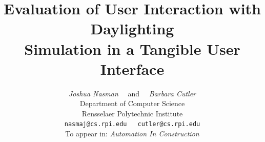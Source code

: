 \documentclass[preprint]{elsarticle}
\begin{document}
\begin{frontmatter}


%
%




\title{
Evaluation of User Interaction with Daylighting \\ Simulation in a Tangible User Interface}


\author{
\parbox[t]{9cm}{\centering
	     {\em Joshua Nasman}~~ and ~~{\em Barbara Cutler}\\
             Department of Computer Science\\
	     Rensselaer Polytechnic Institute\\
	     {\tt nasmaj@cs.rpi.edu}~~~{\tt cutler@cs.rpi.edu}\\
	     {To appear in: \em Automation In Construction}}
}





\end{frontmatter}
\end{document}
